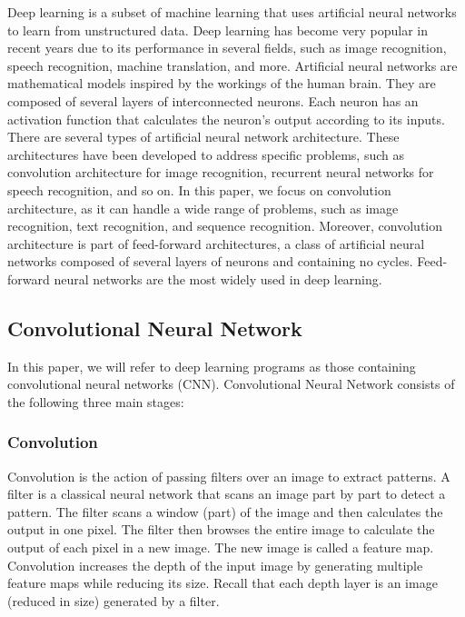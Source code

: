\label{sec:introduction}

Deep learning is a subset of machine learning that uses artificial neural networks to learn from unstructured data. Deep learning has become very popular in recent years due to its performance in several fields, such as image recognition, speech recognition, machine translation, and more. Artificial neural networks are mathematical models inspired by the workings of the human brain. They are composed of several layers of interconnected neurons. Each neuron has an activation function that calculates the neuron's output according to its inputs. There are several types of artificial neural network architecture. These architectures have been developed to address specific problems, such as convolution architecture for image recognition, recurrent neural networks for speech recognition, and so on. In this paper, we focus on convolution architecture, as it can handle a wide range of problems, such as image recognition, text recognition, and sequence recognition. Moreover, convolution architecture is part of feed-forward architectures, a class of artificial neural networks composed of several layers of neurons and containing no cycles. Feed-forward neural networks are the most widely used in deep learning.\\


\subsection{Convolutional Neural Network}
In this paper, we will refer to deep learning programs as those containing convolutional neural networks (CNN). Convolutional Neural Network consists of the following three main stages:\\

\subsubsection*{Convolution}
Convolution is the action of passing filters over an image to extract patterns. A filter is a classical neural network that scans an image part by part to detect a pattern. The filter scans a window (part) of the image and then calculates the output in one pixel. The filter then browses the entire image to calculate the output of each pixel in a new image. The new image is called a feature map. Convolution increases the depth of the input image by generating multiple feature maps while reducing its size. Recall that each depth layer is an image (reduced in size) generated by a filter.\\

